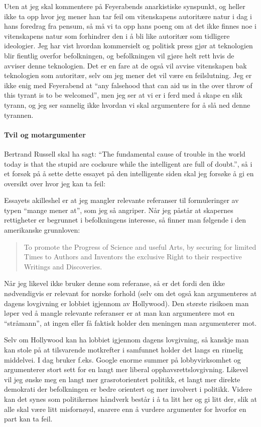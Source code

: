 \documentclass[11pt,norsk,a4paper]{article}
\begin{document}
Uten at jeg skal kommentere på Feyerabends anarkistiske synspunkt, og
heller ikke ta opp hvor jeg mener han tar feil om vitenskapens
autoritære natur i dag i hans foredrag fra pensum\cite{feyer}, så må
vi ta opp hans poeng om at det ikke finnes noe i vitenskapens natur som
forhindrer den i å bli like autoritær som tidligere ideologier. Jeg
har vist hvordan kommersielt og politisk press gjør at teknologien
blir fientlig overfor befolkningen, og befolkningen vil gjøre helt
rett hvis de avviser denne teknologien. Det er en fare at de også vil
avvise vitenskapen bak teknologien som autoritær, selv om jeg mener
det vil være en feilslutning. Jeg er ikke enig med Feyerabend at ``any
falsehood that can aid us in the over throw of this tyrant is to be
welcomed'', men jeg ser at vi er i ferd med å skape en slik tyrann, og
jeg ser sannelig ikke hvordan vi skal argumentere for å slå ned denne
tyrannen. 

\paragraph{Tvil og motargumenter}

Bertrand Russell skal ha sagt: ``The fundamental cause of trouble in
the world today is that the stupid are cocksure while the intelligent
are full of doubt.'', så i et forsøk på å sette dette essayet på den
intelligente siden skal jeg forsøke å gi en oversikt over hvor jeg kan
ta feil:

Essayets akilleshel er at jeg mangler relevante referanser til
formuleringer av typen ``mange mener at'', som jeg så angriper. Når
jeg påstår at skapernes rettigheter er begrunnet i befolkningens
interesse, så finner man følgende i den amerikanske grunnloven: 
\begin{quote}
To promote the Progress of Science and useful Arts, by securing for
limited Times to Authors and Inventors the exclusive Right to their
respective Writings and Discoveries.
\end{quote}
Når jeg likevel ikke bruker denne som referanse, så er det fordi den
ikke nødvendigvis er relevant for norske forhold (selv om det også kan
argumenteres at dagens lovgivning er lobbiet igjennom av
Hollywood). Den største risikoen man løper ved å mangle relevante
referanser er at man kan argumentere mot en ``stråmann'', at ingen
eller få faktisk holder den meningen man argumenterer mot.

Selv om Hollywood kan ha lobbiet igjennom dagens lovgivning, så
kanskje man kan stole på at tilsvarende motkrefter i samfunnet holder
det langs en rimelig middelvei. I dag bruker f.eks. Google enorme
summer på lobbyvirksomhet og argumenterer stort sett for en langt mer
liberal opphavsrettslovgivning. Likevel vil jeg ønske meg en langt mer
grasrotorientert politikk, et langt mer direkte demokrati der
befolkningen er bedre orientert og mer involvert i politikk. Videre
kan det synes som politikernes håndverk består i å ta litt her og gi
litt der, slik at alle skal være litt misfornøyd, snarere enn å
vurdere argumenter for hvorfor en part kan ta feil.
\end{document}
